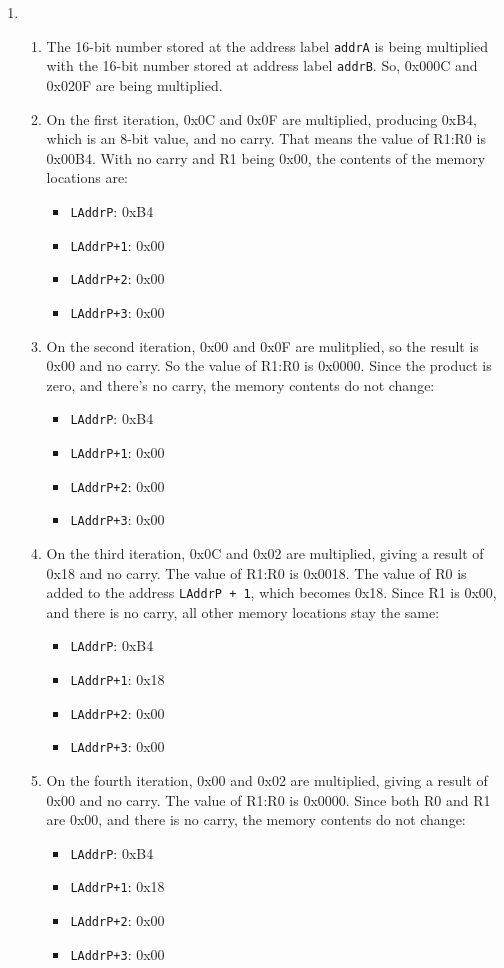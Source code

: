 \documentclass[11pt]{article}
\begin{document}
\begin{enumerate}[leftmargin=0.2in]
\item
\begin{enumerate}
  \item The 16-bit number stored at the address label \texttt{addrA} is being multiplied with the 16-bit number stored at address label \texttt{addrB}. So, 0x000C and 0x020F are being multiplied.
  \item On the first iteration, 0x0C and 0x0F are multiplied, producing 0xB4, which is an 8-bit value, and no carry. That means the value of R1:R0 is 0x00B4. With no carry and R1 being 0x00, the contents of the memory locations are:
    \begin{itemize}
      \item \texttt{LAddrP}: 0xB4
      \item \texttt{LAddrP+1}: 0x00
      \item \texttt{LAddrP+2}: 0x00
      \item \texttt{LAddrP+3}: 0x00
    \end{itemize}
  \item On the second iteration, 0x00 and 0x0F are mulitplied, so the result is 0x00 and no carry. So the value of R1:R0 is 0x0000. Since the product is zero, and there's no carry, the memory contents do not change:
    \begin{itemize}
      \item \texttt{LAddrP}: 0xB4
      \item \texttt{LAddrP+1}: 0x00
      \item \texttt{LAddrP+2}: 0x00
      \item \texttt{LAddrP+3}: 0x00
    \end{itemize}
  \item On the third iteration, 0x0C and 0x02 are multiplied, giving a result of 0x18 and no carry. The value of R1:R0 is 0x0018. The value of R0 is added to the address \texttt{LAddrP + 1}, which becomes 0x18. Since R1 is 0x00, and there is no carry, all other memory locations stay the same:
    \begin{itemize}
      \item \texttt{LAddrP}: 0xB4
      \item \texttt{LAddrP+1}: 0x18
      \item \texttt{LAddrP+2}: 0x00
      \item \texttt{LAddrP+3}: 0x00
    \end{itemize}
  \item On the fourth iteration, 0x00 and 0x02 are multiplied, giving a result of 0x00 and no carry. The value of R1:R0 is 0x0000. Since both R0 and R1 are 0x00, and there is no carry, the memory contents do not change:
    \begin{itemize}
      \item \texttt{LAddrP}: 0xB4
      \item \texttt{LAddrP+1}: 0x18
      \item \texttt{LAddrP+2}: 0x00
      \item \texttt{LAddrP+3}: 0x00
    \end{itemize}
\end{enumerate}


\end{enumerate}
\end{document}
